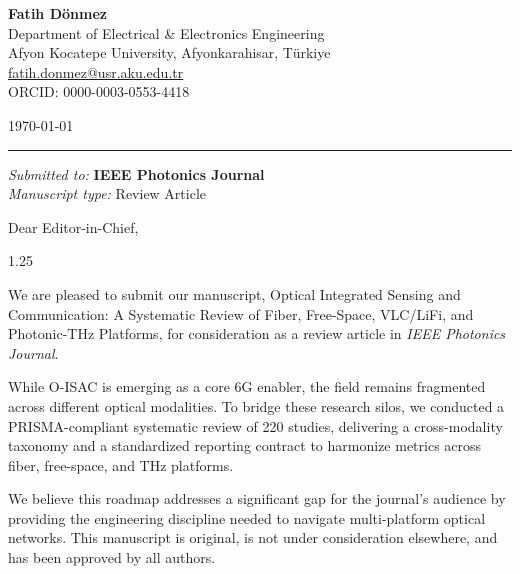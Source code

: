 \documentclass[11pt]{article}
\begin{document}
\begin{minipage}[t]{0.65\textwidth}
    \raggedright
    {\color{accentblue}\large\bfseries Fatih Dönmez}\\[2pt]
    {\small Department of Electrical \& Electronics Engineering}\\
    {\small Afyon Kocatepe University, Afyonkarahisar, Türkiye}\\[4pt]
    {\small\color{textgray}
        \href{mailto:fatih.donmez@usr.aku.edu.tr}{fatih.donmez@usr.aku.edu.tr}\\
        ORCID: 0000-0003-0553-4418
    }
\end{minipage}%
\hfill
\begin{minipage}[t]{0.30\textwidth}
    \raggedleft
    {\small\color{textgray} \today}
\end{minipage}

\vspace{6pt}
{\color{accentblue}\rule{\linewidth}{1.5pt}}
\vspace{15pt}

{\small\color{textgray}
\textit{Submitted to:} \textbf{IEEE Photonics Journal}\\
\textit{Manuscript type:} Review Article
}

\vspace{20pt}

Dear Editor-in-Chief,

\begin{spacing}{1.25}

We are pleased to submit our manuscript, Optical Integrated Sensing and Communication: A Systematic Review of Fiber, Free-Space, VLC/LiFi, and Photonic-THz Platforms, for consideration as a review article in \textit{IEEE Photonics Journal}.

While O-ISAC is emerging as a core 6G enabler, the field remains fragmented across different optical modalities. To bridge these research silos, we conducted a PRISMA-compliant systematic review of 220 studies, delivering a cross-modality taxonomy and a standardized reporting contract to harmonize metrics across fiber, free-space, and THz platforms.

We believe this roadmap addresses a significant gap for the journal’s audience by providing the engineering discipline needed to navigate multi-platform optical networks. This manuscript is original, is not under consideration elsewhere, and has been approved by all authors.

\end{spacing}
\end{document}
